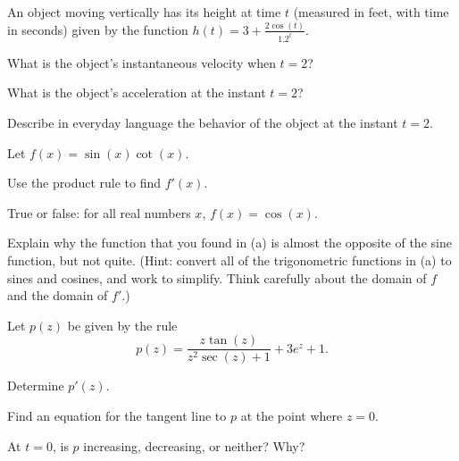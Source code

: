 \begin{exercises} 
\item An object moving vertically has its height at time $t$ (measured in feet, with time in seconds) given by the function $h(t) = 3 + \frac{2\cos(t)}{1.2^t}$.
\ba
	\item What is the object's instantaneous velocity when $t =2$?
	\item What is the object's acceleration at the instant $t = 2$?
	\item Describe in everyday language the behavior of the object at the instant $t = 2$.
\ea
\item Let $f(x) = \sin(x) \cot(x)$.
\ba
	\item Use the product rule to find $f'(x)$.
	\item True or false: for all real numbers $x$, $f(x) = \cos(x)$.
	\item Explain why the function that you found in (a) is almost the opposite of the sine function, but not quite.  (Hint: convert all of the trigonometric functions in (a) to sines and cosines, and work to simplify.  Think carefully about the domain of $f$ and the domain of $f'$.)
\ea
\item Let $p(z)$ be given by the rule
$$p(z) = \frac{z\tan(z)}{z^2\sec(z) + 1} + 3 e^z + 1.$$
\ba
	\item Determine $p'(z)$.
	\item Find an equation for the tangent line to $p$ at the point where $z = 0$.
	\item At $t = 0$, is $p$ increasing, decreasing, or neither?  Why?
\ea
\end{exercises}
\afterexercises